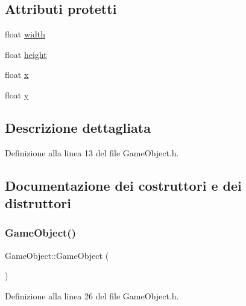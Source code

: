 \subsection*{Attributi protetti}
\begin{DoxyCompactItemize}
\item 
float \hyperlink{class_game_object_af797cec05ff1d3cbc694fc7036add37b}{width}
\item 
float \hyperlink{class_game_object_a0ae9c255f47b6148c26d0333a72d0625}{height}
\item 
float \hyperlink{class_game_object_ad4976cd29785cf9bd791148ff397c41e}{x}
\item 
float \hyperlink{class_game_object_a9ac54f1c686ecf5656139a829ed62041}{y}
\end{DoxyCompactItemize}


\subsection{Descrizione dettagliata}


Definizione alla linea 13 del file Game\+Object.\+h.



\subsection{Documentazione dei costruttori e dei distruttori}
\mbox{\label{class_game_object_a0348e3ee2e83d56eafca7a3547f432c4}} 
\subsubsection{\texorpdfstring{Game\+Object()}{GameObject()}\hspace{0.1cm}{\footnotesize\ttfamily [1/2]}}
{\footnotesize\ttfamily Game\+Object\+::\+Game\+Object (\begin{DoxyParamCaption}{ }\end{DoxyParamCaption})\hspace{0.3cm}{\ttfamily [inline]}}



Definizione alla linea 26 del file Game\+Object.\+h.

\mbox{\label{class_game_object_aacbfc590fef88ae437762c2faa17387b}} 
